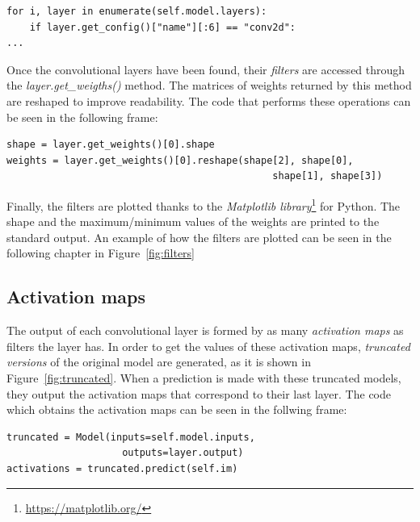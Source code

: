 \begin{lstlisting}
for i, layer in enumerate(self.model.layers):
	if layer.get_config()["name"][:6] == "conv2d":
...
\end{lstlisting}

Once the convolutional layers have been found, their \emph{filters} are accessed through the \textit{layer.get\_weigths()} method. The matrices of weights returned by this method are reshaped to improve readability. The code that performs these operations can be seen in the following frame:

\begin{lstlisting}
shape = layer.get_weights()[0].shape
weights = layer.get_weights()[0].reshape(shape[2], shape[0],
                                              shape[1], shape[3])
\end{lstlisting}

Finally, the filters are plotted thanks to the \emph{Matplotlib library}\footnote{\url{https://matplotlib.org/}} for Python. The shape and the maximum/minimum values of the weights are printed to the standard output. An example of how the filters are plotted can be seen in the following chapter in Figure~\ref{fig:filters}

\subsection{Activation maps}
The output of each convolutional layer is formed by as many \emph{activation maps} as filters the layer has. In order to get the values of these activation maps, \emph{truncated versions} of the original model are generated, as it is shown in Figure~\ref{fig:truncated}. When a prediction is made with these truncated models, they output the activation maps that correspond to their last layer. The code which obtains the activation maps can be seen in the follwing frame:
\begin{lstlisting}
truncated = Model(inputs=self.model.inputs,
                    outputs=layer.output)
activations = truncated.predict(self.im)
\end{lstlisting}

